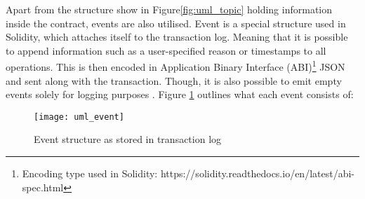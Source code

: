 Apart from the structure show in Figure\ref{fig:uml_topic} holding information inside the contract, events are also utilised. Event is a special structure used in Solidity, which attaches itself to the transaction log. Meaning that it is possible to append information such as a user-specified reason or timestamps to all operations. This is then encoded in Application Binary Interface (ABI)\footnote{Encoding type used in Solidity: https://solidity.readthedocs.io/en/latest/abi-spec.html} JSON and sent along with the transaction. Though, it is also possible to emit empty events solely for logging purposes \citep{dannen2017introducing}.  Figure \ref{fig:uml_event} outlines what each event consists of:
\begin{figure}[h]
    \centering
    \texttt{[image: uml\_event]}
    \caption{Event structure as stored in transaction log}
    \label{fig:uml_event}
\end{figure}

